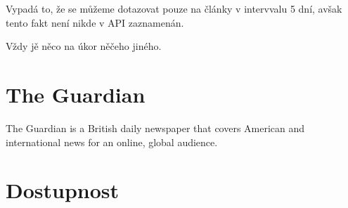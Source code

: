 Vypadá to, že se můžeme dotazovat pouze na články v intervvalu 5 dní, avšak tento fakt není nikde v API zaznamenán.

Vždy jě něco na úkor něčeho jiného. 

\section{The Guardian}
The Guardian is a British daily newspaper that covers American and international news for an online, global audience.
\section{Dostupnost}
